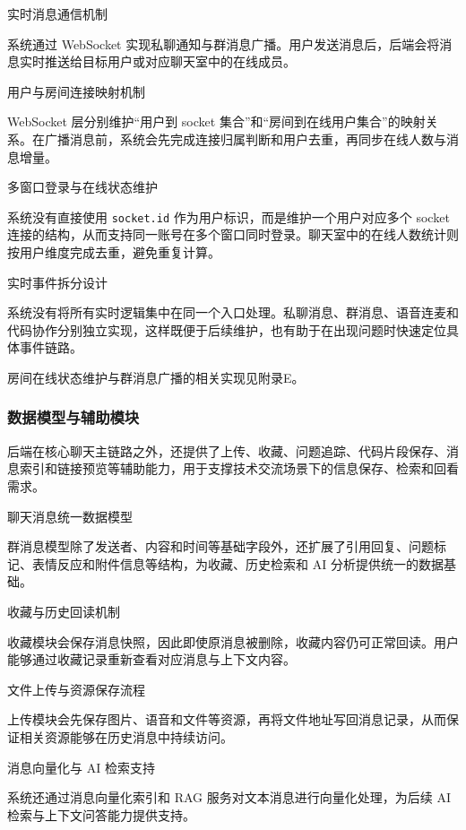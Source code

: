 \begin{usecaselist}

\item 实时消息通信机制

系统通过 WebSocket 实现私聊通知与群消息广播。用户发送消息后，后端会将消息实时推送给目标用户或对应聊天室中的在线成员。

\item 用户与房间连接映射机制

WebSocket 层分别维护“用户到 socket 集合”和“房间到在线用户集合”的映射关系。在广播消息前，系统会先完成连接归属判断和用户去重，再同步在线人数与消息增量。

\item 多窗口登录与在线状态维护

系统没有直接使用 \texttt{socket.id} 作为用户标识，而是维护一个用户对应多个 socket 连接的结构，从而支持同一账号在多个窗口同时登录。聊天室中的在线人数统计则按用户维度完成去重，避免重复计算。

\item 实时事件拆分设计

系统没有将所有实时逻辑集中在同一个入口处理。私聊消息、群消息、语音连麦和代码协作分别独立实现，这样既便于后续维护，也有助于在出现问题时快速定位具体事件链路。

\end{usecaselist}

房间在线状态维护与群消息广播的相关实现见附录E。

\subsubsection{数据模型与辅助模块}

后端在核心聊天主链路之外，还提供了上传、收藏、问题追踪、代码片段保存、消息索引和链接预览等辅助能力，用于支撑技术交流场景下的信息保存、检索和回看需求。

\begin{usecaselist}

\item 聊天消息统一数据模型

群消息模型除了发送者、内容和时间等基础字段外，还扩展了引用回复、问题标记、表情反应和附件信息等结构，为收藏、历史检索和 AI 分析提供统一的数据基础。

\item 收藏与历史回读机制

收藏模块会保存消息快照，因此即使原消息被删除，收藏内容仍可正常回读。用户能够通过收藏记录重新查看对应消息与上下文内容。

\item 文件上传与资源保存流程

上传模块会先保存图片、语音和文件等资源，再将文件地址写回消息记录，从而保证相关资源能够在历史消息中持续访问。

\item 消息向量化与 AI 检索支持

系统还通过消息向量化索引和 RAG 服务对文本消息进行向量化处理，为后续 AI 检索与上下文问答能力提供支持\cite{mongodbdocs2026,llmplatform2024}。

\end{usecaselist}

